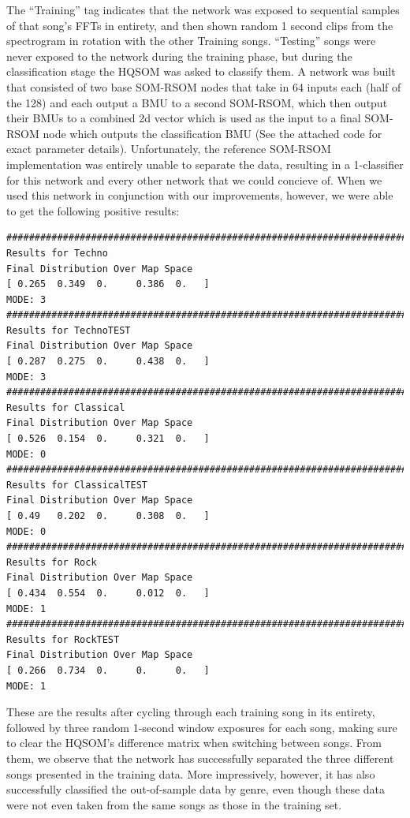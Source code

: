 \documentclass[a4paper,10pt]{article}
\begin{document}
The ``Training'' tag indicates that the network was exposed to sequential samples of that song's
FFTs in entirety, and then shown random 1 second clips from the spectrogram in rotation with the
other Training songs. ``Testing'' songs were never exposed to the network during the training
phase, but during the classification stage the HQSOM was asked to classify them. A network was built
that consisted of two base SOM-RSOM nodes that take in 64 inputs each (half of the 128) and each
output a BMU to a second SOM-RSOM, which then output their BMUs to a combined 2d vector which is
used as the input to a final SOM-RSOM node which outputs the classification BMU (See the attached
code for exact parameter details).  Unfortunately, the reference SOM-RSOM implementation was
entirely unable to separate the data, resulting in a 1-classifier for this network and every
other network that we could concieve of. When we used this network in conjunction with our
improvements, however, we were able to get the following positive results:
\begin{center}
\small
\begin{verbatim}
################################################################################
Results for Techno
Final Distribution Over Map Space
[ 0.265  0.349  0.     0.386  0.   ]
MODE: 3
################################################################################
Results for TechnoTEST
Final Distribution Over Map Space
[ 0.287  0.275  0.     0.438  0.   ]
MODE: 3
################################################################################
Results for Classical
Final Distribution Over Map Space
[ 0.526  0.154  0.     0.321  0.   ]
MODE: 0
################################################################################
Results for ClassicalTEST
Final Distribution Over Map Space
[ 0.49   0.202  0.     0.308  0.   ]
MODE: 0
################################################################################
Results for Rock
Final Distribution Over Map Space
[ 0.434  0.554  0.     0.012  0.   ]
MODE: 1
################################################################################
Results for RockTEST
Final Distribution Over Map Space
[ 0.266  0.734  0.     0.     0.   ]
MODE: 1
\end{verbatim}
\end{center}

These are the results after cycling through each training song in its entirety, followed by three
random 1-second window exposures for each song, making sure to clear the HQSOM's difference matrix
when switching between songs.  From them, we observe that the network has successfully separated the
three different songs presented in the training data.  More impressively, however, it has also
successfully classified the out-of-sample data by genre, even though these data were not even taken
from the same songs as those in the training set.
\end{document}
